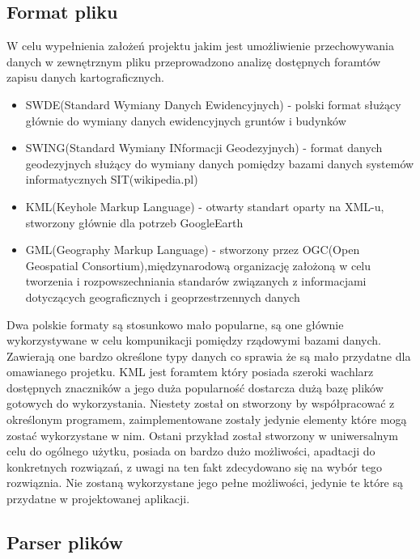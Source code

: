 \subsection{Format pliku}
\label{subsec:fileformat}

W celu wypełnienia założeń projektu jakim jest umożliwienie przechowywania danych w zewnętrznym pliku przeprowadzono analizę dostępnych foramtów zapisu danych kartograficznych.

\begin{itemize}

\item
SWDE(Standard Wymiany Danych Ewidencyjnych) - polski format służący głównie do wymiany danych ewidencyjnych gruntów i budynków

\item
SWING(Standard Wymiany INformacji Geodezyjnych) - format danych geodezyjnych służący do wymiany danych pomiędzy bazami danych systemów informatycznych SIT(wikipedia.pl)

\item
KML(Keyhole Markup Language) - otwarty standart oparty na XML-u, stworzony głównie dla potrzeb GoogleEarth

\item
GML(Geography Markup Language) - stworzony przez OGC(Open Geospatial Consortium),międzynarodową organizację założoną w celu tworzenia i rozpowszechniania standarów związanych z informacjami dotyczących geograficznych i geoprzestrzennych danych

\end{itemize}

Dwa polskie formaty są stosunkowo mało popularne, są one głównie wykorzystywane w celu kompunikacji pomiędzy rządowymi bazami danych. Zawierają one bardzo określone typy danych co sprawia że są mało przydatne dla omawianego projetku. KML jest foramtem który posiada szeroki wachlarz dostępnych znaczników a jego duża popularność dostarcza dużą bazę plików gotowych do wykorzystania. Niestety został on stworzony by współpracować z określonym programem, zaimplementowane zostały jedynie elementy które mogą zostać wykorzystane w nim. Ostani przykład został stworzony w uniwersalnym celu do ogólnego użytku, posiada on bardzo dużo możliwości, apadtacji do konkretnych rozwiązań\cite{gml}, z uwagi na ten fakt zdecydowano się na wybór tego rozwiąznia. Nie zostaną wykorzystane jego pełne możliwości, jedynie te które są przydatne w projektowanej aplikacji.  


\subsection{Parser plików}
\label{subsec:parser}

